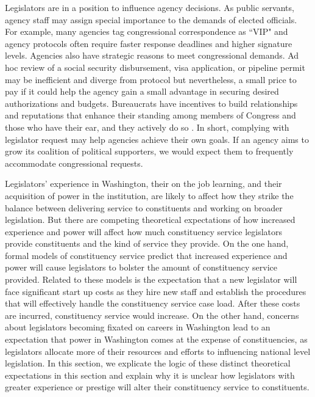 \documentclass{article}
\begin{document}
Legislators are in a position to influence agency decisions. As public servants, agency staff may assign special importance to the demands of elected officials.  For example, many agencies tag congressional correspondence as ``VIP" and agency protocols often require faster response deadlines and higher signature levels. Agencies also have strategic reasons to meet congressional demands. Ad hoc review of a social security disbursement, visa application, or pipeline permit may be inefficient and diverge from protocol but nevertheless, a small price to pay if it could help the agency gain a small advantage in securing desired authorizations and budgets.  Bureaucrats have incentives to build relationships and reputations that enhance their standing among members of Congress and those who have their ear, and they actively do so \citep{Carpenter2001}.  In short, complying with legislator request may help agencies achieve their own goals.  If an agency aims to grow its coalition of political supporters, we would expect them to frequently accommodate congressional requests.

Legislators' experience in Washington, their on the job learning, and their acquisition of power in the institution, are likely to affect how they strike the balance between delivering service to constituents and working on broader legislation.  But there are competing theoretical expectations of how increased experience and power will affect how much constituency service legislators provide constituents and the kind of service they provide.  On the one hand, formal models of constituency service predict that increased experience and power will cause legislators to bolster the amount of constituency service provided.  Related to these models is the expectation that a new legislator will face significant start up costs as they hire new staff and establish the procedures that will effectively handle the constituency service case load.  After these costs are incurred, constituency service would increase.  On the other hand, concerns about legislators becoming fixated on careers in Washington lead to an expectation that power in Washington comes at the expense of constituencies, as legislators allocate more of their resources and efforts to influencing national level legislation.   In this section, we explicate the logic of these distinct theoretical expectations in this section and explain why it is unclear how legislators with greater experience or prestige will alter their constituency service to constituents.  
\end{document}
